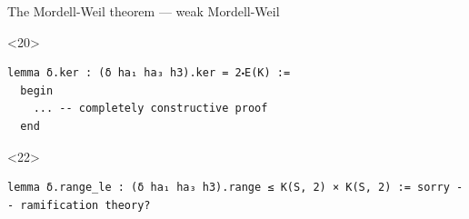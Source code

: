 \documentclass[10pt]{beamer}
\begin{document}
\begin{frame}[fragile, t]{The Mordell-Weil theorem --- weak Mordell-Weil}

\begin{onlyenv}<20>
\begin{lstlisting}[basicstyle=\scriptsize, frame=single]
lemma δ.ker : (δ ha₁ ha₃ h3).ker = 2⬝E(K) :=
  begin
    ... -- completely constructive proof
  end
\end{lstlisting}
\end{onlyenv}


\begin{onlyenv}<22>
\begin{lstlisting}[basicstyle=\scriptsize, frame=single]
lemma δ.range_le : (δ ha₁ ha₃ h3).range ≤ K(S, 2) × K(S, 2) := sorry -- ramification theory?
\end{lstlisting}
\end{onlyenv}

\end{frame}
\end{document}
